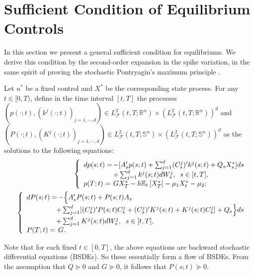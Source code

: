 \documentclass[final]{siamltex}
\begin{document}
\section{Sufficient Condition of Equilibrium Controls}\label{formal-derivation}

In this section we present a general sufficient condition for equilibriums.
We derive this condition by  the second-order expansion in the spike variation, in the same spirit of proving the stochastic
Pontryagin's maximum principle \cite{peng90,YZ}.

Let $u^*$ be a fixed control and $X^*$ be the corresponding state process. For any $t\in [0, T)$,
define in the time interval $[t, T]$  the  processes $(p(\cdot;t), (k^j(\cdot;t))_{j=1,\cdots, d})\in L^2_{{\mathcal F}}(t,T;{\mathbb{R}}^n)\times (L^2_{{\mathcal F}}(t,T;{\mathbb{R}}^n))^d$ and
$(P(\cdot;t), (K^j(\cdot;t))_{j=1,\cdots,d})\in L^2_{{\mathcal F}}(t,T;\mathbb S^n)\times (L^2_{{\mathcal F}}(t,T;\mathbb S^n))^d$
as the solutions to the following equations:
\begin{eqnarray}
&&\left\{\begin{array}{ll}
dp(s;t)=&\hspace{-0.3cm}-[A_s'p(s;t)+\sum_{j=1}^d(C_s^j)' k^j(s;t)+Q_sX^*_s]ds\\
        &\hspace{-0.3cm} +\sum_{j=1}^dk^j(s;t)dW_s^j,\;\;s\in[t,T],\\
p(T;t)=&\hspace{-0.3cm}G X^*_T- h {\mathbb{E}_t\left[{X^*_T}\right]}-\mu_1 X_t^*-\mu_2;
\end{array}\right.  \label{adjoint1general} \\
&&\left\{\begin{array}{ll}
dP(s;t)=&\hspace{-0.3cm}-\Big\{A_s'P(s;t)+P(s;t)A_s \\
&\hspace{-0.4cm}+\sum_{j=1}^d[(C_s^j)'P(s;t)C_s^j+(C_s^j)'K^j(s;t)+K^j(s;t)C_s^j]+Q_s\Big\}ds\\
&\hspace{-0.4cm}+\sum_{j=1}^dK^j(s;t)dW_s^j,\;\;s\in[t,T],\\
P(T;t)=&\hspace{-0.3cm}G.
\end{array}\right. \label{adjoint2general}
\end{eqnarray}

Note that for each fixed $t\in[0,T]$, the above equations are backward stochastic differential equations (BSDEs).
So these essentially form a flow of BSDEs. From the assumption that   $Q\succeq 0$ and $G\succeq 0$, it follows that
$P(s;t)\succeq 0$.
\end{document}
